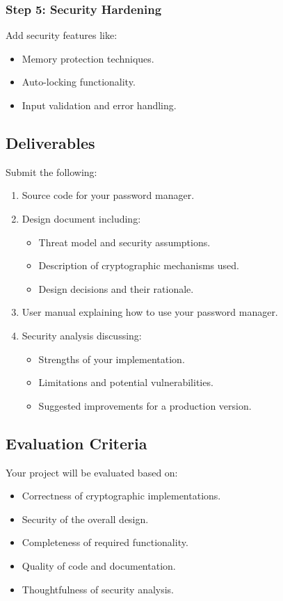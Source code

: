 \documentclass[10pt,a4paper,american]{exam}
\begin{document}
\subsubsection*{Step 5: Security Hardening}
Add security features like:
\begin{itemize}
	\item Memory protection techniques.
	\item Auto-locking functionality.
	\item Input validation and error handling.
\end{itemize}

\subsection*{Deliverables}
Submit the following:

\begin{enumerate}
	\item Source code for your password manager.
	\item Design document including:
	      \begin{itemize}
		      \item Threat model and security assumptions.
		      \item Description of cryptographic mechanisms used.
		      \item Design decisions and their rationale.
	      \end{itemize}
	\item User manual explaining how to use your password manager.
	\item Security analysis discussing:
	      \begin{itemize}
		      \item Strengths of your implementation.
		      \item Limitations and potential vulnerabilities.
		      \item Suggested improvements for a production version.
	      \end{itemize}
\end{enumerate}

\subsection*{Evaluation Criteria}
Your project will be evaluated based on:

\begin{itemize}
	\item Correctness of cryptographic implementations.
	\item Security of the overall design.
	\item Completeness of required functionality.
	\item Quality of code and documentation.
	\item Thoughtfulness of security analysis.
\end{itemize}
\end{document}
